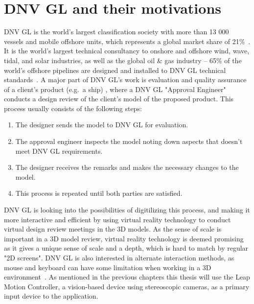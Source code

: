 \section{DNV GL and their motivations}
DNV GL is the world's largest classification society with more than 13 000 vessels and mobile offshore units, which represents a global market share of 21\%~\citep{TO:DNVGL}. 
It is the world's largest technical consultancy to onshore and offshore wind, wave, tidal, and solar industries, as well as the global oil \& gas industry 
-- 65\% of the world’s offshore pipelines are designed and installed to DNV GL technical standards~\citep{MTN:DNVGL}. 
A major part of DNV GL's work is evaluation and quality assurance of a client's product (e.g.~a ship) , 
where a DNV GL "Approval Engineer" conducts a design review of the client's model of the proposed product. 
This process usually consists of the following steps: 

\begin{enumerate}
	\item The designer sends the model to DNV GL for evaluation.
	\item The approval engineer inspects the model noting down aspects that doesn't meet DNV GL requirements.
	\item The designer receives the remarks and makes the necessary changes to the model.
	\item This process is repeated until both parties are satisfied.
\end{enumerate}

DNV GL is looking into the possibilities of digitilizing this process, and making it more interactive and efficient by using
virtual reality technology to conduct virtual design review meetings in the 3D models. 
As the sense of scale is important in a 3D model review, virtual reality technology is deemed promising as it gives a unique sense of scale
and a depth, which is hard to match by regular "2D screens". DNV GL is also interested in alternate interaction methods, as mouse and keyboard 
can have some limitation when working in a 3D environment~\citep{Rautaray2015}. As mentioned in the previous chapters this thesis will use 
the Leap Motion Controller, a vision-based device using stereoscopic cameras, as a primary input device to the application. 

